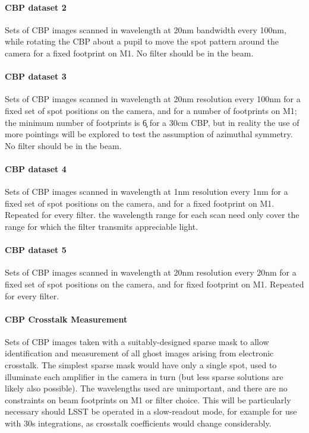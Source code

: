 	
\paragraph{CBP dataset 2}\label{sec:CPP:inputs:CBP:spot}
Sets of CBP images scanned in wavelength at 20nm bandwidth every 100nm, while rotating the CBP about a pupil to move the spot pattern around the camera for a fixed footprint on M1. No filter should be in the beam.

	
\paragraph{CBP dataset 3}\label{sec:CPP:inputs:CBP:M1}
Sets of CBP images scanned in wavelength at 20nm resolution every 100nm for a fixed set of spot positions on the camera, and for a number of footprints on M1; the minimum number of footprints is \c 6 for a 30cm CBP, but in reality the use of more pointings will be explored to test the assumption of azimuthal symmetry. No filter should be in the beam.


\paragraph{CBP dataset 4}\label{sec:CPP:inputs:CBP:filter}
Sets of CBP images scanned in wavelength at 1nm resolution every 1nm for a fixed set of spot positions on the camera, and for a fixed footprint on M1. Repeated for every filter. \Nb the wavelength range for each scan need only cover the range for which the filter transmits appreciable light.


\paragraph{CBP dataset 5}\label{sec:CPP:inputs:CBP:leak}
Sets of CBP images scanned in wavelength at 20nm resolution every 20nm for a fixed set of spot positions on the camera, and for fixed footprint on M1. Repeated for every filter.


\paragraph {CBP Crosstalk Measurement}\label{sec:CPP:inputs:CBP:crosstalk}
Sets of CBP images taken with a suitably-designed sparse mask to allow identification and measurement of all ghost images arising from electronic crosstalk. The simplest sparse mask would have only a single spot, used to illuminate each amplifier in the camera in turn (but less sparse solutions are likely also possible). The wavelengths used are unimportant, and there are no constraints on beam footprints on M1 or filter choice. This will be particularly necessary should LSST be operated in a slow-readout mode, for example for use with 30s integrations, as crosstalk coefficients would change considerably.


